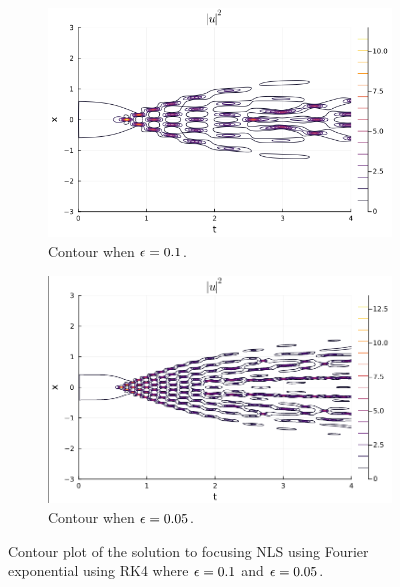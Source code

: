 \documentclass[12pt]{report}
\begin{document}
\begin{solution}
    \begin{figure}[H]
        \begin{subfigure}[b]{0.5\linewidth}
            \centering
            \includegraphics[width=\linewidth]{images/3-1.png}
            \caption{Contour when ${\epsilon}=0.1$.}
            \label{fig3:a}
            \vspace{4ex}
        \end{subfigure}%
        \begin{subfigure}[b]{0.5\linewidth}
            \centering
            \includegraphics[width=\linewidth]{images/3-2.png}
            \caption{Contour when ${\epsilon}=0.05$.}
            \label{fig3:b}
            \vspace{4ex}
        \end{subfigure}
        \caption{Contour plot of the solution to focusing NLS using Fourier exponential using RK4 where ${\epsilon}=0.1$ and ${\epsilon}=0.05$.}
        \label{fig3}
    \end{figure}
\end{solution}
\end{document}
